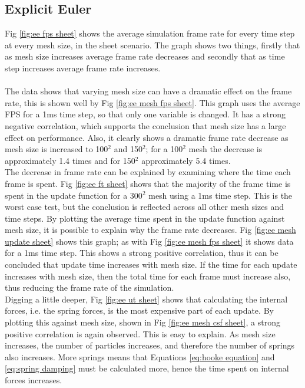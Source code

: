 \subsection{Explicit Euler}
Fig \ref{fig:ee fps sheet} shows the average simulation frame rate for every time step at every mesh size, in the sheet scenario. The graph shows two things, firstly that as mesh size increases average frame rate decreases and secondly that as time step increases average frame rate increases.
\\\\The data shows that varying mesh size can have a dramatic effect on the frame rate, this is shown well by Fig \ref{fig:ee mesh fps sheet}. This graph uses the average FPS for a 1ms time step, so that only one variable is changed. It has a strong negative correlation, which supports the conclusion that mesh size has a large effect on performance. Also, it clearly shows a dramatic frame rate decrease as mesh size is increased to 100$^{2}$ and 150$^{2}$; for a 100$^{2}$ mesh the decrease is approximately 1.4 times and for 150$^{2}$ approximately 5.4 times.
\\The decrease in frame rate can be explained by examining where the time each frame is spent. Fig \ref{fig:ee ft sheet} shows that the majority of the frame time is spent in the update function for a 300$^{2}$ mesh using a 1ms time step. This is the worst case test, but the conclusion is reflected across all other mesh sizes and time steps. By plotting the average time spent in the update function against mesh size, it is possible to explain why the frame rate decreases. Fig \ref{fig:ee mesh update sheet} shows this graph; as with Fig \ref{fig:ee mesh fps sheet} it shows data for a 1ms time step. This shows a strong positive correlation, thus it can be concluded that update time increases with mesh size. If the time for each update increases with mesh size, then the total time for each frame must increase also, thus reducing the frame rate of the simulation. 
\\Digging a little deeper, Fig \ref{fig:ee ut sheet} shows that calculating the internal forces, i.e. the spring forces, is the most expensive part of each update. By plotting this against mesh size, shown in Fig \ref{fig:ee mesh csf sheet}, a strong positive correlation is again observed. This is easy to explain. As mesh size increases, the number of particles increases, and therefore the number of springs also increases. More springs means that Equations \ref{eq:hooke equation} and \ref{eq:spring damping} must be calculated more, hence the time spent on internal forces increases.
